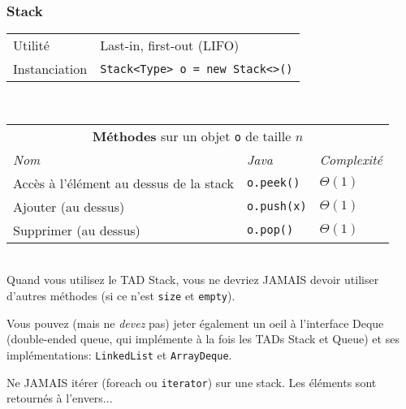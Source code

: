 \documentclass[8pt,aspectratio=169]{beamer}
\begin{document}
\begin{frame}
\frametitle{Stack}
\centering
\begin{tabular}{ll}
	Utilité & Last-in, first-out (LIFO)\\
	Instanciation & \texttt{Stack<Type> o = new Stack<>()}
\end{tabular}\\
\vspace{0.5cm}
\centering
\begin{tabular}{lll}
	\multicolumn{3}{c}{\textbf{Méthodes} sur un objet \texttt{o} de taille $n$} \\
	\textit{Nom} & \textit{Java} & \textit{Complexité} \\
	Accès à l'élément au dessus de la stack & \texttt{o.peek()} & $\Theta(1)$\\
	Ajouter (au dessus) & \texttt{o.push(x)} & $\Theta(1)$\\
	Supprimer (au dessus) & \texttt{o.pop()} & $\Theta(1)$\\
\end{tabular}\\
\vspace{0.5cm}
\color{blue} Quand vous utilisez le TAD Stack, vous ne devriez JAMAIS devoir utiliser d'autres méthodes (si ce n'est \texttt{size} et \texttt{empty}). 

\color{blue} Vous pouvez (mais ne \textit{devez} pas) jeter également un oeil à l'interface Deque (double-ended queue, qui implémente à la fois les TADs Stack et Queue) et ses implémentations: \texttt{LinkedList} et \texttt{ArrayDeque}.

\color{red} Ne JAMAIS itérer (foreach ou \texttt{iterator}) sur une stack. Les éléments sont retournés à l'envers...

\end{frame}
\end{document}

